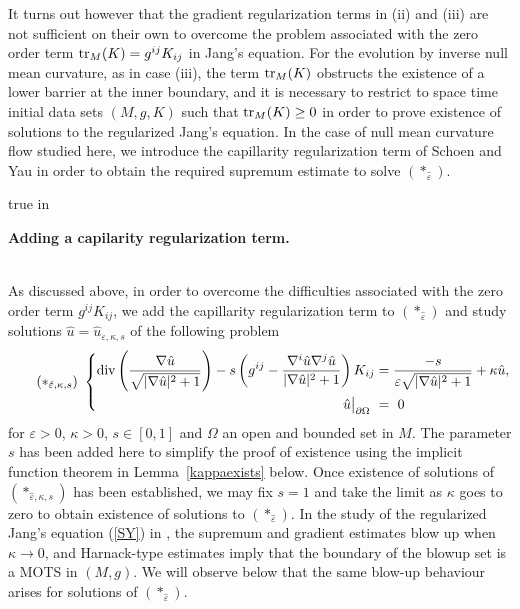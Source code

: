 \documentclass[11pt]{amsart}
\begin{document}
It turns out however that the gradient regularization terms in (ii) and (iii) are not sufficient on their own to overcome the problem associated with the zero order term $\operatorname{tr}_M(K)=g^{ij}K_{ij}$ in Jang's equation. For the evolution by inverse null mean curvature, as in case (iii), the term $\operatorname{tr}_M(K)$ obstructs the existence of a lower barrier at the inner boundary, and it is necessary to restrict to space time initial data sets $(M, g, K)$ such that $\operatorname{tr}_M(K)\geq 0$ in order to prove existence of solutions to the regularized Jang's equation. 
In the case of null mean curvature flow studied here, we introduce the capillarity regularization term of Schoen and Yau in order to obtain the required supremum estimate to solve $(*_{\hat{\varepsilon}})$.

 true in

\noindent\begin{large}\textbf{Adding a capilarity regularization term.}\end{large}\\
As discussed above, in order to overcome the difficulties associated with the zero order term $g^{ij}K_{ij}$, we add the capillarity regularization term to $(*_{\hat{\varepsilon}})$ and study solutions $\hat{u}=\hat{u}_{\varepsilon,\kappa,s}$ of the following problem
\[\tag{$*_{\hat{\varepsilon},\kappa,s}$} \,\,
\left\lbrace
\begin{aligned}
 \mbox{div}\left(\dfrac{\nabla \hat{u}}{\sqrt{|\nabla \hat{u}|^2+1}}\right)-s\left(g^{ij}-\dfrac{\nabla^i\hat{u}\nabla^j\hat{u}}{|\nabla \hat{u}|^2+1}\right)K_{ij}&=\dfrac{-s}{\varepsilon\sqrt{|\nabla \hat{u}|^2+1}}+\kappa\hat{u},\\
\hat u\big|_{\partial\Omega}\,\,&=\,\,0
\end{aligned}
\right.
\]
for $\varepsilon>0$, $\kappa>0$, $s\in[0,1]$ and $\Omega$  an open and bounded set in $M$. The parameter $s$ has been added here to simplify the proof of existence using the implicit function theorem in Lemma~\ref{kappaexists} below. Once existence of solutions of $(*_{\hat{\varepsilon},\kappa,s})$ has been established, we may fix $s=1$ and take the limit as $\kappa$ goes to zero to obtain existence of solutions to $(*_{\hat{\varepsilon}})$. In the study of the regularized Jang's equation (\ref{SY}) in \cite{SY81}, the supremum and gradient  estimates blow up when  $\kappa\to0$, and Harnack-type estimates imply that the boundary of the blowup set is a MOTS in $(M,g)$. We will observe below that the same blow-up behaviour arises for solutions of $(*_{\hat{\varepsilon}})$. 
\end{document}
